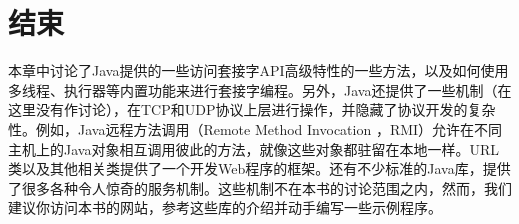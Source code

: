 \section{结束} 

	本章中讨论了Java提供的一些访问套接字API高级特性的一些方法，以及如何使用多线程、执行器等内置功能来进行套接字编程。另外，Java还提供了一些机制（在这里没有作讨论），在TCP和UDP协议上层进行操作，并隐藏了协议开发的复杂性。例如，Java远程方法调用（Remote Method Invocation ，RMI）允许在不同主机上的Java对象相互调用彼此的方法，就像这些对象都驻留在本地一样。URL类以及其他相关类提供了一个开发Web程序的框架。还有不少标准的Java库，提供了很多各种令人惊奇的服务机制。这些机制不在本书的讨论范围之内，然而，我们建议你访问本书的网站，参考这些库的介绍并动手编写一些示例程序。 


